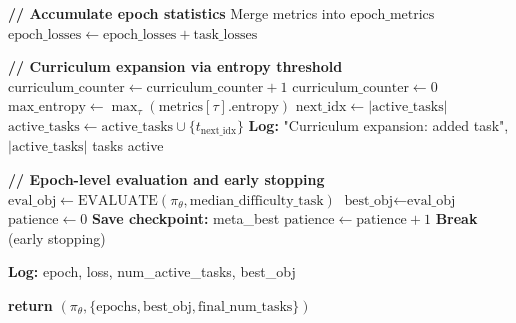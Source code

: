 \documentclass[11pt,a4paper]{article}
\begin{document}
\begin{algorithm}[h]
\begin{algorithmic}[1]
		\State \textbf{// Accumulate epoch statistics}
		\State Merge metrics into $\text{epoch\_metrics}$
		\State $\text{epoch\_losses} \leftarrow \text{epoch\_losses} + \text{task\_losses}$

		\State \textbf{// Curriculum expansion via entropy threshold}
		\State $\text{curriculum\_counter} \leftarrow \text{curriculum\_counter} + 1$
			\State $\text{curriculum\_counter} \leftarrow 0$
			\State $\text{max\_entropy} \leftarrow \max_\tau (\text{metrics}[\tau].\text{entropy})$
				\State $\text{next\_idx} \leftarrow |\text{active\_tasks}|$
				\State $\text{active\_tasks} \leftarrow \text{active\_tasks} \cup \{t_{\text{next\_idx}}\}$
				\State \textbf{Log:} "Curriculum expansion: added task", $|\text{active\_tasks}|$ tasks active
			\EndIf
		\EndIf

	\EndFor

	\State \textbf{// Epoch-level evaluation and early stopping}
		\State $\text{eval\_obj} \leftarrow \text{EVALUATE}(\pi_\theta, \text{median\_difficulty\_task})$
			\State $\text{best\_obj} \leftarrow \text{eval\_obj}$
			\State $\text{patience} \leftarrow 0$
			\State \textbf{Save checkpoint:} meta\_best
		\Else
			\State $\text{patience} \leftarrow \text{patience} + 1$
		\EndIf
			\State \textbf{Break} (early stopping)
		\EndIf
	\EndIf

	\State \textbf{Log:} epoch, loss, num\_active\_tasks, best\_obj

\EndFor

\State \textbf{return} $(\pi_\theta, \{\text{epochs}, \text{best\_obj}, \text{final\_num\_tasks}\})$

\end{algorithmic}
\end{algorithm}

\clearpage

\end{document}
